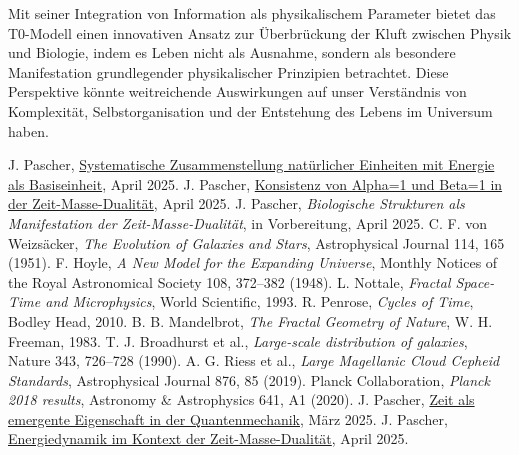 \documentclass[12pt,a4paper]{article}
\begin{document}
	Mit seiner Integration von Information als physikalischem Parameter bietet das T0-Modell einen innovativen Ansatz zur Überbrückung der Kluft zwischen Physik und Biologie, indem es Leben nicht als Ausnahme, sondern als besondere Manifestation grundlegender physikalischer Prinzipien betrachtet. Diese Perspektive könnte weitreichende Auswirkungen auf unser Verständnis von Komplexität, Selbstorganisation und der Entstehung des Lebens im Universum haben.
	
	
	\begin{thebibliography}{99}
		 J. Pascher, \href{https://github.com/jpascher/T0-Time-Mass-Duality/blob/main/2/pdf/Deutsch/NatEinheitenSystematik.pdf}{Systematische Zusammenstellung natürlicher Einheiten mit Energie als Basiseinheit}, April 2025.
		 J. Pascher, \href{https://github.com/jpascher/T0-Time-Mass-Duality/blob/main/2/pdf/Deutsch/Alpha1Beta1Konsistenz.pdf}{Konsistenz von Alpha=1 und Beta=1 in der Zeit-Masse-Dualität}, April 2025.
		 J. Pascher, \textit{Biologische Strukturen als Manifestation der Zeit-Masse-Dualität}, in Vorbereitung, April 2025.
		 C. F. von Weizsäcker, \textit{The Evolution of Galaxies and Stars}, Astrophysical Journal 114, 165 (1951).
		 F. Hoyle, \textit{A New Model for the Expanding Universe}, Monthly Notices of the Royal Astronomical Society 108, 372--382 (1948).
		 L. Nottale, \textit{Fractal Space-Time and Microphysics}, World Scientific, 1993.
		 R. Penrose, \textit{Cycles of Time}, Bodley Head, 2010.
		 B. B. Mandelbrot, \textit{The Fractal Geometry of Nature}, W. H. Freeman, 1983.
		 T. J. Broadhurst et al., \textit{Large-scale distribution of galaxies}, Nature 343, 726--728 (1990).
		 A. G. Riess et al., \textit{Large Magellanic Cloud Cepheid Standards}, Astrophysical Journal 876, 85 (2019).
		 Planck Collaboration, \textit{Planck 2018 results}, Astronomy \& Astrophysics 641, A1 (2020).
		 J. Pascher, \href{https://github.com/jpascher/T0-Time-Mass-Duality/blob/main/2/pdf/Deutsch/ZeitEmergentQM.pdf}{Zeit als emergente Eigenschaft in der Quantenmechanik}, März 2025.
		 J. Pascher, \href{https://github.com/jpascher/T0-Time-Mass-Duality/blob/main/2/pdf/Deutsch/MathEnergiedynamik.pdf}{Energiedynamik im Kontext der Zeit-Masse-Dualität}, April 2025.

\end{thebibliography}
\end{document}
